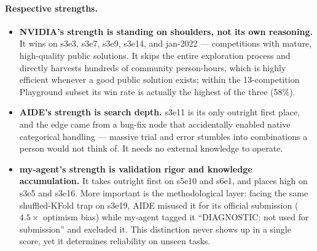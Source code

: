 \documentclass[11pt,a4paper]{article}
\begin{document}
\paragraph{Respective strengths.}
\begin{itemize}[leftmargin=*]
\item \textbf{NVIDIA's strength is standing on shoulders, not its own reasoning.} It wins on s3e3, s3e7, s3e9, s3e14, and jan-2022 --- competitions with mature, high-quality public solutions. It skips the entire exploration process and directly harvests hundreds of community person-hours, which is highly efficient whenever a good public solution exists; within the 13-competition Playground subset its win rate is actually the highest of the three (58\%).
\item \textbf{AIDE's strength is search depth.} s3e11 is its only outright first place, and the edge came from a bug-fix node that accidentally enabled native categorical handling --- massive trial and error stumbles into combinations a person would not think of. It needs no external knowledge to operate.
\item \textbf{my-agent's strength is validation rigor and knowledge accumulation.} It takes outright first on s5e10 and s6e1, and places high on s3e5 and s3e16. More important is the methodological layer: facing the same shuffled-KFold trap on s3e19, AIDE misused it for its official submission ($4.5\times$ optimism bias) while my-agent tagged it ``DIAGNOSTIC: not used for submission'' and excluded it. This distinction never shows up in a single score, yet it determines reliability on unseen tasks.
\end{itemize}
\end{document}
